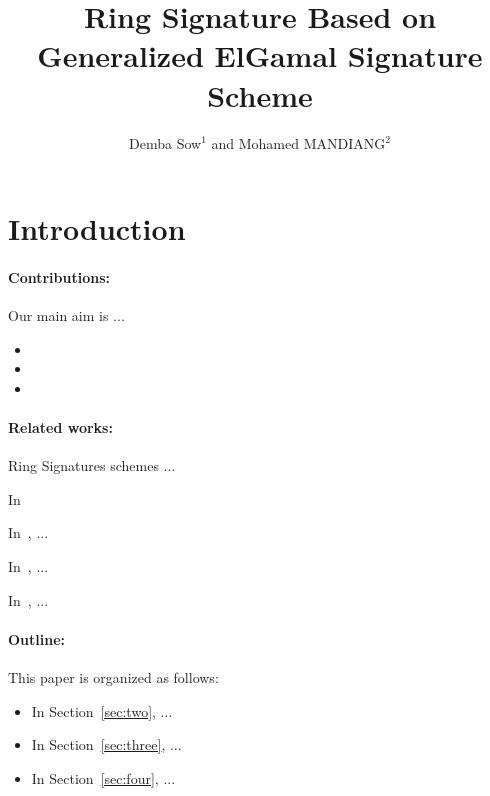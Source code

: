 \documentclass[a4paper,11pt]{article}
\begin{document}
\title{Ring Signature Based on Generalized ElGamal Signature Scheme}
\author{\scriptsize{Demba Sow$^{1}$ and Mohamed MANDIANG$^{2}$}}

\maketitle


\tableofcontents

    \begin{abstract}

    \end{abstract}

\section{Introduction}

\paragraph{Contributions:} Our main aim is ...

\begin{itemize}
 \item
 \item
 \item
\end{itemize}

\paragraph{Related works:} Ring Signatures schemes ...

In~\cite{ringsignOrigine}

In~\cite{Elgamal}, ...


In~\cite{ringSignElG}, ...


In~\cite{sow}, ...



\paragraph{Outline:} This paper is organized as follows:
\begin{itemize}
 \item In Section~\ref{sec:two}, ...
 \item In Section~\ref{sec:three}, ...
 \item In Section~\ref{sec:four}, ...
\end{itemize}
\end{document}
